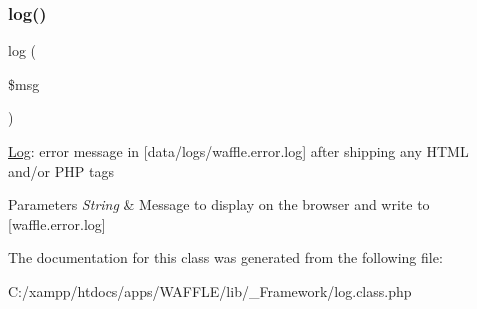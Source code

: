 \subsubsection{\texorpdfstring{log()}{log()}}
{\footnotesize\ttfamily log (\begin{DoxyParamCaption}\item[{}]{\$msg }\end{DoxyParamCaption})}

\hyperlink{class_w_a_f_f_l_e_1_1_framework_1_1_i_o_1_1_log}{Log}\+: error message in \mbox{[}data/logs/waffle.\+error.\+log\mbox{]} after shipping any H\+T\+ML and/or P\+HP tags


\begin{DoxyParams}{Parameters}
{\em String} & Message to display on the browser and write to \mbox{[}waffle.\+error.\+log\mbox{]} \\
\hline
\end{DoxyParams}


The documentation for this class was generated from the following file\+:\begin{DoxyCompactItemize}
\item 
C\+:/xampp/htdocs/apps/\+W\+A\+F\+F\+L\+E/lib/\+\_\+\+Framework/log.\+class.\+php\end{DoxyCompactItemize}
